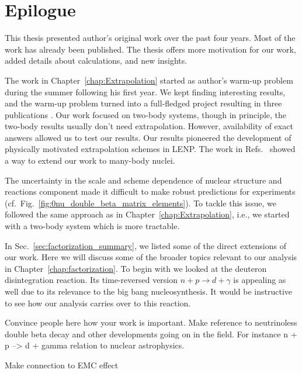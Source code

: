 \cleardoublepage
\chapter{Epilogue}

	This thesis presented author's original work over the past four years.
	Most of the work has already been published.  The thesis offers more
	motivation for our work, added details about calculations, and new insights.

	The work in Chapter~\ref{chap:Extrapolation} started as author's warm-up
	problem during the summer following his first year.  We kept finding
	interesting results, and the warm-up problem turned into a full-fledged
	project resulting in three publications
	\cite{More:2013rma,Furnstahl:2013vda,Konig:2014hma}.
	Our work focused on two-body systems, though in principle, the
	two-body results usually don't need extrapolation.
	However, availability of exact answers allowed us to test our results.
	Our results pioneered
	the development of physically motivated extrapolation schemes in LENP.  
	The work in Refs.~\cite{Furnstahl:2014hca,Wendt:2015nba,Binder:2015trg}
	showed a way to extend our work to many-body nuclei.

	The uncertainty in the scale and scheme dependence of nuclear structure
	and reactions component made it difficult to make robust predictions
	for experiments (cf.~Fig.~\ref{fig:0nu_double_beta_matrix_elements}).
	To tackle this issue, we followed the same approach as in
	Chapter~\ref{chap:Extrapolation}, i.e., we started with a two-body
	system which is more tractable.

	In Sec.~\ref{sec:factorization_summary}, we listed some of the direct
	extensions of our work.  Here we will discuss some of the broader topics
	relevant to our analysis in Chapter~\ref{chap:factorization}.  To
	begin with we looked at the deuteron disintegration reaction.  Its
	time-reversed version $n + p \rightarrow d + \gamma$ is appealing as
	well due to its relevance to the big bang nucleosynthesis.  It would be
	instructive to see how our analysis carries over to this reaction.

	Convince people here how your work is important. Make reference to
	neutrinoless
	double beta decay and other developments going on in the field. For instance
	n + p --> d + gamma relation to nuclear astrophysics.

	Make connection to EMC effect
